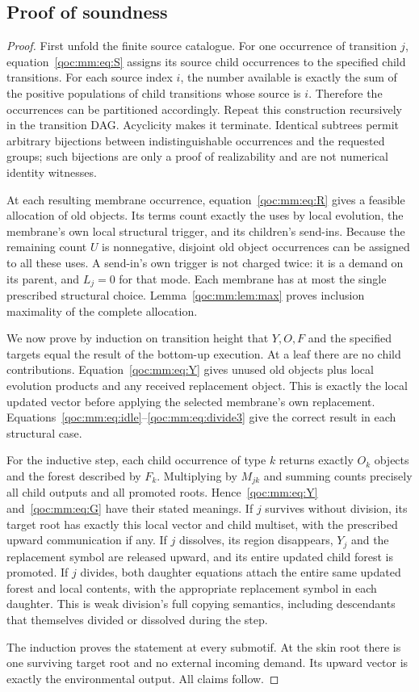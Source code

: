 \documentclass[11pt,letterpaper]{article}
\theoremstyle{definition}
\theoremstyle{remark}
\begin{document}
\subsection{Proof of soundness}
\begin{proof}
First unfold the finite source catalogue. For one occurrence of transition $j$, equation~\eqref{qoc:mm:eq:S} assigns its source child occurrences to the specified child transitions. For each source index $i$, the number available is exactly the sum of the positive populations of child transitions whose source is $i$. Therefore the occurrences can be partitioned accordingly. Repeat this construction recursively in the transition DAG. Acyclicity makes it terminate. Identical subtrees permit arbitrary bijections between indistinguishable occurrences and the requested groups; such bijections are only a proof of realizability and are not numerical identity witnesses.

At each resulting membrane occurrence, equation~\eqref{qoc:mm:eq:R} gives a feasible allocation of old objects. Its terms count exactly the uses by local evolution, the membrane's own local structural trigger, and its children's send-ins. Because the remaining count $U$ is nonnegative, disjoint old object occurrences can be assigned to all these uses. A send-in's own trigger is not charged twice: it is a demand on its parent, and $L_j=0$ for that mode. Each membrane has at most the single prescribed structural choice. Lemma~\ref{qoc:mm:lem:max} proves inclusion maximality of the complete allocation.

We now prove by induction on transition height that $Y,O,F$ and the specified targets equal the result of the bottom-up execution. At a leaf there are no child contributions. Equation~\eqref{qoc:mm:eq:Y} gives unused old objects plus local evolution products and any received replacement object. This is exactly the local updated vector before applying the selected membrane's own replacement. Equations~\eqref{qoc:mm:eq:idle}--\eqref{qoc:mm:eq:divide3} give the correct result in each structural case.

For the inductive step, each child occurrence of type $k$ returns exactly $O_k$ objects and the forest described by $F_k$. Multiplying by $M_{jk}$ and summing counts precisely all child outputs and all promoted roots. Hence~\eqref{qoc:mm:eq:Y} and~\eqref{qoc:mm:eq:G} have their stated meanings. If $j$ survives without division, its target root has exactly this local vector and child multiset, with the prescribed upward communication if any. If $j$ dissolves, its region disappears, $Y_j$ and the replacement symbol are released upward, and its entire updated child forest is promoted. If $j$ divides, both daughter equations attach the entire same updated forest and local contents, with the appropriate replacement symbol in each daughter. This is weak division's full copying semantics, including descendants that themselves divided or dissolved during the step.

The induction proves the statement at every submotif. At the skin root there is one surviving target root and no external incoming demand. Its upward vector is exactly the environmental output. All claims follow.
\end{proof}
\end{document}
